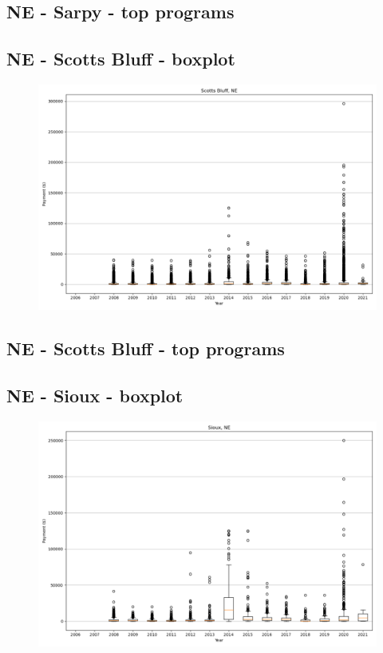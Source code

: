 \subsection*{NE - Sarpy - top programs}

\newpage
\subsection*{NE - Scotts Bluff - boxplot}
\begin{figure}[h]
\centering
\includegraphics[width=7in]{../output/boxplots/counties/Scotts Bluff-NE_boxplot.png}
\end{figure}


\subsection*{NE - Scotts Bluff - top programs}

\newpage
\subsection*{NE - Sioux - boxplot}
\begin{figure}[h]
\centering
\includegraphics[width=7in]{../output/boxplots/counties/Sioux-NE_boxplot.png}
\end{figure}


